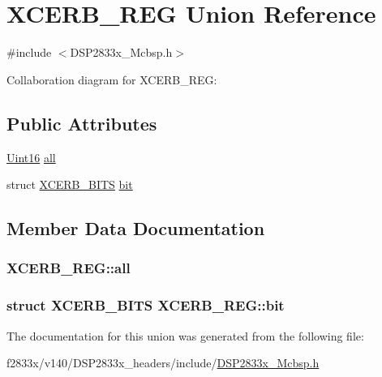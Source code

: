 \hypertarget{union_x_c_e_r_b___r_e_g}{}\section{X\+C\+E\+R\+B\+\_\+\+R\+E\+G Union Reference}
\label{union_x_c_e_r_b___r_e_g}


{\ttfamily \#include $<$D\+S\+P2833x\+\_\+\+Mcbsp.\+h$>$}



Collaboration diagram for X\+C\+E\+R\+B\+\_\+\+R\+E\+G\+:
\subsection*{Public Attributes}
\begin{DoxyCompactItemize}
\item 
\hyperlink{_d_s_p2833x___device_8h_a59a9f6be4562c327cbfb4f7e8e18f08b}{Uint16} \hyperlink{union_x_c_e_r_b___r_e_g_a21c75797e78f1655e09cba004c6bcd46}{all}
\item 
struct \hyperlink{struct_x_c_e_r_b___b_i_t_s}{X\+C\+E\+R\+B\+\_\+\+B\+I\+T\+S} \hyperlink{union_x_c_e_r_b___r_e_g_accf2d694be9a6fdc219772bd63882070}{bit}
\end{DoxyCompactItemize}


\subsection{Member Data Documentation}
\hypertarget{union_x_c_e_r_b___r_e_g_a21c75797e78f1655e09cba004c6bcd46}{}
\subsubsection[{all}]{ X\+C\+E\+R\+B\+\_\+\+R\+E\+G\+::all}\label{union_x_c_e_r_b___r_e_g_a21c75797e78f1655e09cba004c6bcd46}
\hypertarget{union_x_c_e_r_b___r_e_g_accf2d694be9a6fdc219772bd63882070}{}
\subsubsection[{bit}]{\setlength{\rightskip}{0pt plus 5cm}struct {\bf X\+C\+E\+R\+B\+\_\+\+B\+I\+T\+S} X\+C\+E\+R\+B\+\_\+\+R\+E\+G\+::bit}\label{union_x_c_e_r_b___r_e_g_accf2d694be9a6fdc219772bd63882070}


The documentation for this union was generated from the following file\+:\begin{DoxyCompactItemize}
\item 
f2833x/v140/\+D\+S\+P2833x\+\_\+headers/include/\hyperlink{_d_s_p2833x___mcbsp_8h}{D\+S\+P2833x\+\_\+\+Mcbsp.\+h}\end{DoxyCompactItemize}
